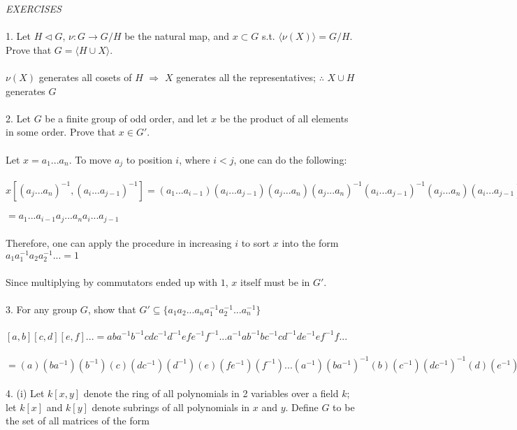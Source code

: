 \documentclass{article}
\begin{document}
\begin{siderules}\color{blue}\textit{EXERCISES}\color{black}\\\\
\color{blue}1. Let \(H\vartriangleleft G\), \(\nu:G\to G/H\) be the natural map, and \(x\subset G\) s.t. \(\langle \nu(X)\rangle=G/H\). Prove that \(G=\langle H\cup X\rangle\).\\\\\color{black}
\(\nu(X)\) generates all cosets of \(H\) \(\Longrightarrow\) \(X\) generates all the representatives; \(\therefore\) \(X\cup H\) generates \(G\)\\\\
\color{blue}2. Let \(G\) be a finite group of odd order, and let \(x\) be the product of all elements in some order. Prove that \(x\in G'\).\color{black}\\\\
Let \(x=a_{1}...a_{n}\). To move \(a_{j}\) to position \(i\), where \(i<j\), one can do the following: \\\\
\(x[(a_{j}...a_{n})^{-1}, (a_{i}...a_{j-1})^{-1}]=(a_{1}...a_{i-1})(a_{i}...a_{j-1})(a_{j}...a_{n})(a_{j}...a_{n})^{-1}(a_{i}...a_{j-1})^{-1}(a_{j}...a_{n})(a_{i}...a_{j-1})\)\\\\
\(=a_{1}...a_{i-1}a_{j}...a_{n}a_{i}...a_{j-1}\)\\\\
Therefore, one can apply the procedure in increasing \(i\) to sort \(x\) into the form \(a_{1}a_{1}^{-1}a_{2}a_{2}^{-1}...=1\)\\\\
Since multiplying by commutators ended up with \(1\), \(x\) itself must be in \(G'\).\\\\
\color{blue}3. For any group \(G\), show that \(G'\subseteq\{a_{1}a_{2}...a_{n}a_{1}^{-1}a_{2}^{-1}...a_{n}^{-1}\}\)\color{black}\\\\
\([a,b][c,d][e,f]...=aba^{-1}b^{-1}cdc^{-1}d^{-1}efe^{-1}f^{-1}...a^{-1}ab^{-1}bc^{-1}cd^{-1}de^{-1}ef^{-1}f...\)\\\\
\(=(a)(ba^{-1})(b^{-1})(c)(dc^{-1})(d^{-1})(e)(fe^{-1})(f^{-1})...(a^{-1})(ba^{-1})^{-1}(b)(c^{-1})(dc^{-1})^{-1}(d)(e^{-1})(fe^{-1})^{-1}(f)...\)\\\\
\color{blue}4. (i) Let \(k[x,y]\) denote the ring of all polynomials in 2 variables over a field \(k\); let \(k[x]\) and \(k[y]\) denote subrings of all polynomials in \(x\) and \(y\). Define \(G\) to be the set of all matrices of the form 

\end{siderules}
\end{document}
